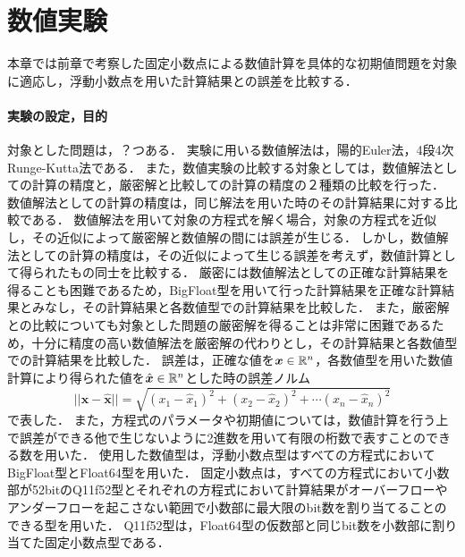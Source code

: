 \chapter{数値実験}
本章では前章で考察した固定小数点による数値計算を具体的な初期値問題を対象に適応し，浮動小数点を用いた計算結果との誤差を比較する．
\subsubsection{実験の設定，目的}
対象とした問題は，？つある．
実験に用いる数値解法は，陽的Euler法，4段4次Runge-Kutta法である．
また，数値実験の比較する対象としては，数値解法としての計算の精度と，厳密解と比較しての計算の精度の２種類の比較を行った．
数値解法としての計算の精度は，同じ解法を用いた時のその計算結果に対する比較である．
数値解法を用いて対象の方程式を解く場合，対象の方程式を近似し，その近似によって厳密解と数値解の間には誤差が生じる．
しかし，数値解法としての計算の精度は，その近似によって生じる誤差を考えず，数値計算として得られたもの同士を比較する．
厳密には数値解法としての正確な計算結果を得ることも困難であるため，BigFloat型を用いて行った計算結果を正確な計算結果とみなし，その計算結果と各数値型での計算結果を比較した．
また，厳密解との比較についても対象とした問題の厳密解を得ることは非常に困難であるため，十分に精度の高い数値解法を厳密解の代わりとし，その計算結果と各数値型での計算結果を比較した．
誤差は，正確な値を$\bm{x} \in \mathbb{R}^n$，各数値型を用いた数値計算により得られた値を$\hat{\bm{x}} \in \mathbb{R}^n$とした時の誤差ノルム
\begin{equation}
    ||\bm{x} - \hat{\bm{x}}|| = \sqrt{(x_1 - \hat{x}_1)^2 + (x_2 - \hat{x}_2)^2 + \cdots (x_n - \hat{x}_n)^2}
\end{equation}
で表した．
また，方程式のパラメータや初期値については，数値計算を行う上で誤差ができる他で生じないように2進数を用いて有限の桁数で表すことのできる数を用いた．
使用した数値型は，浮動小数点型はすべての方程式においてBigFloat型とFloat64型を用いた．
固定小数点は，すべての方程式において小数部が52bitのQ11f52型とそれぞれの方程式において計算結果がオーバーフローやアンダーフローを起こさない範囲で小数部に最大限のbit数を割り当てることのできる型を用いた．
Q11f52型は，Float64型の仮数部と同じbit数を小数部に割り当てた固定小数点型である．
